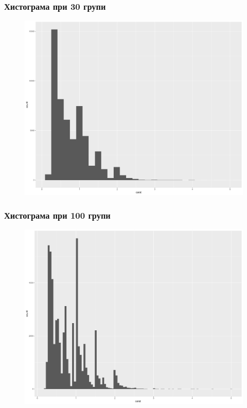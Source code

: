 \documentclass{beamer}
\begin{document}
\begin{frame}
\frametitle{Хистограма при 30 групи}
\begin{figure}[]\includegraphics[width=\textwidth,height=0.75\textheight]{pic0030}\end{figure}
\end{frame}

\begin{frame}
\frametitle{Хистограма при 100 групи}
\begin{figure}[]\includegraphics[width=\textwidth,height=0.75\textheight]{pic0031}\end{figure}
\end{frame}
\end{document}
